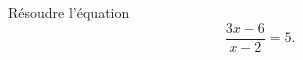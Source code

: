 
\begin{exercice}\label{exosmath-0336}

    Résoudre l'équation
    \begin{equation}
        \frac{ 3x-6 }{ x-2 }=5.
    \end{equation}

\end{exercice}
